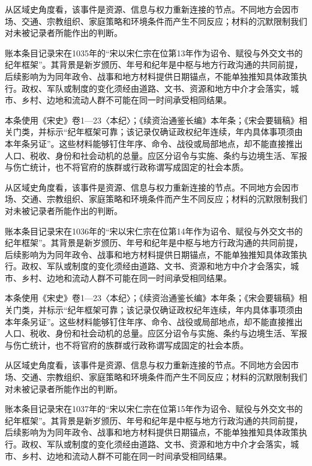 从区域史角度看，该事件是资源、信息与权力重新连接的节点。不同地方会因市场、交通、宗教组织、家庭策略和环境条件而产生不同反应；材料的沉默限制我们对未被记录者所能作出的判断。

账本条目记录宋在1035年的“宋以宋仁宗在位第13年作为诏令、赋役与外交文书的纪年框架”。其背景是新岁颁历、年号和纪年是中枢与地方行政沟通的共同前提，后续影响为为同年政令、战事和地方材料提供日期锚点，不能单独推知具体政策执行。政权、军队或制度的变化须经由道路、文书、资源和地方中介才会落实，城市、乡村、边地和流动人群不可能在同一时间承受相同结果。

本条使用《宋史》卷1—23〈本纪〉；《续资治通鉴长编》本年条；《宋会要辑稿》相关门类，并标示“纪年框架可靠；该记录仅确证政权纪年连续，年内具体事项须由本年条另证”。这些材料能够钉住年序、命令、战役或局部地点，却不能直接推出人口、税收、身份和社会动机的总量。应区分诏令与实施、条约与边境生活、军报与伤亡统计，也不将官府的族群或行政称谓写成固定的社会本质。

从区域史角度看，该事件是资源、信息与权力重新连接的节点。不同地方会因市场、交通、宗教组织、家庭策略和环境条件而产生不同反应；材料的沉默限制我们对未被记录者所能作出的判断。

账本条目记录宋在1036年的“宋以宋仁宗在位第14年作为诏令、赋役与外交文书的纪年框架”。其背景是新岁颁历、年号和纪年是中枢与地方行政沟通的共同前提，后续影响为为同年政令、战事和地方材料提供日期锚点，不能单独推知具体政策执行。政权、军队或制度的变化须经由道路、文书、资源和地方中介才会落实，城市、乡村、边地和流动人群不可能在同一时间承受相同结果。

本条使用《宋史》卷1—23〈本纪〉；《续资治通鉴长编》本年条；《宋会要辑稿》相关门类，并标示“纪年框架可靠；该记录仅确证政权纪年连续，年内具体事项须由本年条另证”。这些材料能够钉住年序、命令、战役或局部地点，却不能直接推出人口、税收、身份和社会动机的总量。应区分诏令与实施、条约与边境生活、军报与伤亡统计，也不将官府的族群或行政称谓写成固定的社会本质。

从区域史角度看，该事件是资源、信息与权力重新连接的节点。不同地方会因市场、交通、宗教组织、家庭策略和环境条件而产生不同反应；材料的沉默限制我们对未被记录者所能作出的判断。

账本条目记录宋在1037年的“宋以宋仁宗在位第15年作为诏令、赋役与外交文书的纪年框架”。其背景是新岁颁历、年号和纪年是中枢与地方行政沟通的共同前提，后续影响为为同年政令、战事和地方材料提供日期锚点，不能单独推知具体政策执行。政权、军队或制度的变化须经由道路、文书、资源和地方中介才会落实，城市、乡村、边地和流动人群不可能在同一时间承受相同结果。

